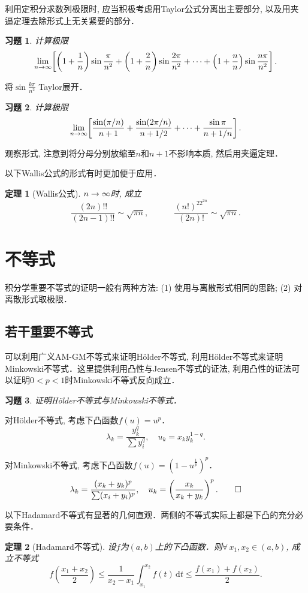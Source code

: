 \documentclass[11pt,a4paper]{ctexart}
\makeatletter
\theoremstyle{thmseries} %
\newtheorem{thm}{定理}[section]
\theoremstyle{exerseries}
\newtheorem{exer}{习题}[section]
\renewenvironment{proof}[1][\proofname]{\par
  \pushQED{\qed}%
  \normalfont \topsep6\p@\@plus6\p@\relax
  \trivlist
  \item[\hskip\labelsep
        \itshape
    #1\@addpunct{}]\ignorespaces
}{%
  \popQED\endtrivlist\@endpefalse
}
\newenvironment{sol}{\begin{proof}[\bfseries\upshape 解\quad]}{\end{proof}}
\newenvironment{pf}{\begin{proof}[\bfseries\upshape 证\quad]}{\end{proof}}
\newcommand{\bra}[1]{\mathopen{}\left(#1\right)}
\newcommand{\sbra}[1]{\mathopen{}\left[#1\right]}
\renewcommand{\d}{\mathrm{d}}
\def \nti {\mathnormal{n}\to\infty}
\makeatother
\begin{document}
利用定积分求数列极限时, 应当积极考虑用Taylor公式分离出主要部分, 以及用夹逼定理去除形式上无关紧要的部分．
\begin{exer}
	计算极限
	\[\lim_{\nti}\sbra{\bra{1+\frac{1}{n}}\sin\frac{\pi}{n^2}+\bra{1+\frac{2}{n}}\sin\frac{2\pi}{n^2}+\cdots+\bra{1+\frac{n}{n}}\sin\frac{n\pi}{n^2}}.\]
\end{exer}
\begin{sol}
	将$\sin\frac{k\pi}{n^2}$ Taylor展开．
\end{sol}

\begin{exer}
	计算极限
	\[\lim_{\nti}\sbra{\frac{\sin(\pi/n)}{n+1}+\frac{\sin(2\pi/n)}{n+1/2}+\cdots+\frac{\sin\pi}{n+1/n}}.\]
\end{exer}
\begin{sol}
	观察形式, 注意到将分母分别放缩至$n$和$n+1$不影响本质, 然后用夹逼定理．
\end{sol}

以下Wallis公式的形式有时更加便于应用．
\begin{thm}[Wallis公式]
	$\nti$时, 成立
	\[\frac{(2n)!!}{(2n-1)!!}\sim\sqrt{\pi n},\quad\qquad\frac{(n!)^22^{2n}}{(2n)!}\sim\sqrt{\pi n}.\]
\end{thm}


\section{不等式}
积分学重要不等式的证明一般有两种方法: (1) 使用与离散形式相同的思路; (2) 对离散形式取极限．
\subsection{若干重要不等式}
可以利用广义AM-GM不等式来证明H\"older不等式, 利用H\"older不等式来证明Minkowski不等式．这里提供利用凸性与Jensen不等式的证法, 利用凸性的证法可以证明$0<p<1$时Minkowski不等式反向成立．
\begin{exer}
	证明H\"older不等式与Minkowski不等式．
\end{exer}
\begin{pf}
	对H\"older不等式, 考虑下凸函数$f(u)=u^p$．
	\[\lambda_k=\frac{y_k^q}{\sum y_i^q},\quad u_k=x_ky_k^{1-q}.\]

	对Minkowski不等式, 考虑下凸函数$f(u)=\bra{1-u^{\frac{1}{p}}}^p$．
	\[\lambda_k=\frac{(x_k+y_k)^p}{\sum(x_i+y_i)^p},\quad u_k=\bra{\frac{x_k}{x_k+y_k}}^p.\qedhere\]
\end{pf}

以下Hadamard不等式有显著的几何直观．两侧的不等式实际上都是下凸的充分必要条件．
\begin{thm}[Hadamard不等式]
	设$f$为$(a,b)$上的下凸函数．则$\forall\,x_1,x_2\in(a,b)$, 成立不等式
	\[f\bra{\frac{x_1+x_2}{2}}\leq\frac{1}{x_2-x_1}\int_{x_1}^{x_2}f(t)\,\d t\leq\frac{f(x_1)+f(x_2)}{2}.\]
\end{thm}
\end{document}
